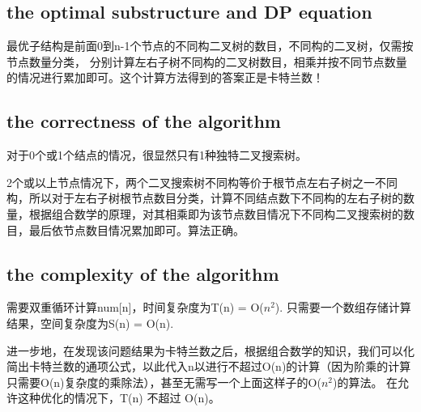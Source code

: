 \documentclass{article}
\begin{document}
\subsection{the optimal substructure and DP equation}
最优子结构是前面0到n-1个节点的不同构二叉树的数目，不同构的二叉树，仅需按节点数量分类，
分别计算左右子树不同构的二叉树数目，相乘并按不同节点数量的情况进行累加即可。这个计算方法得到的答案正是卡特兰数！
\subsection{the correctness of the algorithm}
对于0个或1个结点的情况，很显然只有1种独特二叉搜索树。


2个或以上节点情况下，两个二叉搜索树不同构等价于根节点左右子树之一不同构，所以对于左右子树根节点数目分类，计算不同结点数下不同构的左右子树的数量，根据组合数学的原理，对其相乘即为该节点数目情况下不同构二叉搜索树的数目，最后依节点数目情况累加即可。算法正确。
\subsection{the complexity of the algorithm}
需要双重循环计算num[n]，时间复杂度为T(n) = O($n^{2}$).
只需要一个数组存储计算结果，空间复杂度为S(n) = O(n).


进一步地，在发现该问题结果为卡特兰数之后，根据组合数学的知识，我们可以化简出卡特兰数的通项公式，以此代入n以进行不超过O(n)的计算（因为阶乘的计算只需要O(n)复杂度的乘除法），甚至无需写一个上面这样子的O($n^{2}$)的算法。
在允许这种优化的情况下，T(n) 不超过 O(n)。
\end{document}
